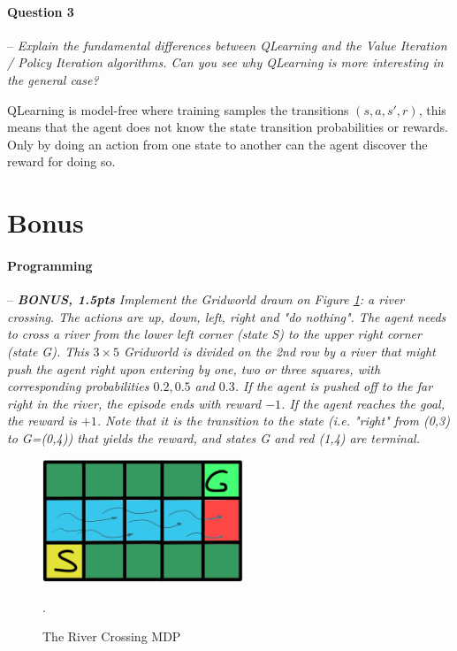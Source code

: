 \documentclass[a4paper]{article}
\newcommand{\question}[2]{
\paragraph{Question #1} -- \textit{#2}

}
\newcommand{\programming}[1]{
\paragraph{Programming} -- \textit{#1}

}
\begin{document}
\question{3}{Explain the fundamental differences between QLearning and the Value Iteration / Policy Iteration algorithms. Can you see why QLearning is more interesting in the general case?}
QLearning is model-free where training samples the transitions $(s, a, s', r)$, this means that the agent does not know the state transition probabilities or rewards.
Only by doing an action from one state to another can the agent discover the reward for doing so.

\section{Bonus}
\programming{\textbf{BONUS, 1.5pts} Implement the Gridworld drawn on Figure \ref{fig:river_crossing}: a river crossing. The actions are up, down, left, right and "do nothing". The agent needs to cross a river from the lower left corner (state S) to the upper right corner (state G). This $3\times 5$ Gridworld is divided on the 2nd row by a river that might push the agent right upon entering by one, two or three squares, with corresponding probabilities $0.2, 0.5$ and $0.3$. If the agent is pushed off to the far right in the river, the episode ends with reward $-1$. If the agent reaches the goal, the reward is $+1$. Note that it is the transition to the state (i.e. "right" from (0,3) to G=(0,4)) that yields the reward, and states G and red (1,4) are terminal. }

\begin{figure}[H]
    \centering
    \includegraphics[width=6cm]{plots/river.png}
    \caption{The River Crossing MDP}.
    \label{fig:river_crossing}
\end{figure}{}


\printbibliography
\end{document}
